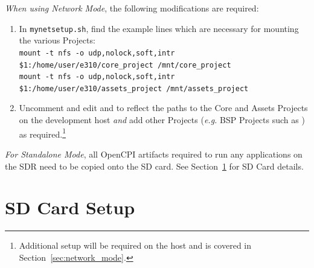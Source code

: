 \begin{flushleft}
\textit{When using Network Mode}, the following modifications are required:
\end{flushleft}

\begin{enumerate}
\item In \texttt{mynetsetup.sh}, find the example lines which are necessary for mounting the various Projects:\\

\verb+mount -t nfs -o udp,nolock,soft,intr $1:/home/user/e310/core_project /mnt/core_project+\\
\verb+mount -t nfs -o udp,nolock,soft,intr $1:/home/user/e310/assets_project /mnt/assets_project+
\item Uncomment and edit  and  to reflect the paths to the Core and Assets Projects on the development host \textit{and} add other Projects (\textit{e.g.} BSP Projects such as ) as required.\footnote{Additional setup will be required on the host and is covered in Section~\ref{sec:network_mode}.}
\end{enumerate}

\begin{flushleft}
\textit{For Standalone Mode}, all OpenCPI artifacts required to run any applications on the SDR need to be copied onto the SD card. See Section~\ref{sec:SD_Setup} for SD Card details.
\end{flushleft}

\section{SD Card Setup}
\label{sec:SD_Setup}
